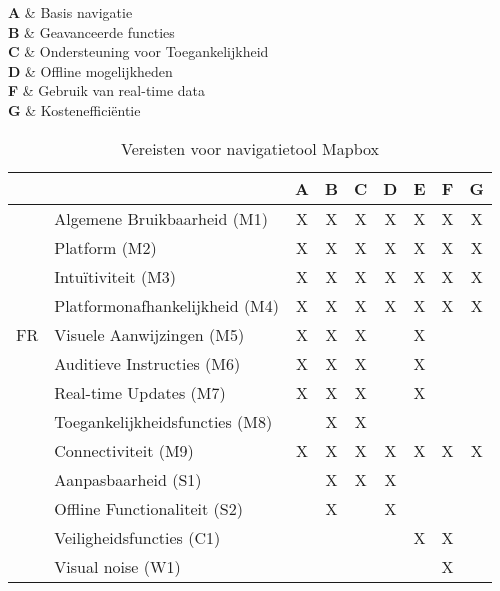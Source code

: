
\textbf{A} \& Basis navigatie \\
\textbf{B} \& Geavanceerde functies \\
\textbf{C} \& Ondersteuning voor Toegankelijkheid \\
\textbf{D} \& Offline mogelijkheden \\
\textbf{F} \& Gebruik van real-time data \\
\textbf{G} \& Kostenefficiëntie \\

\begin{table}[ht]
    \centering
    \caption{Vereisten voor navigatietool Mapbox}
    \label{tab:mapbox_requirements}
    \begin{tabular}{|l|l|c|c|c|c|c|c|c|}
        \hline
        & \textbf{} & \textbf{A} & \textbf{B} & \textbf{C} & \textbf{D} & \textbf{E} & \textbf{F} & \textbf{G} \\ \hline
        \multirow{9}{*}{FR} & Algemene Bruikbaarheid (M1) & X & X & X & X & X & X & X \\ \cline{2-9}
        & Platform (M2) & X & X & X & X & X & X & X \\ \cline{2-9}
        & Intuïtiviteit (M3) & X & X & X & X & X & X & X \\ \cline{2-9}
        & Platformonafhankelijkheid (M4) & X & X & X & X & X & X & X \\ \cline{2-9}
        & Visuele Aanwijzingen (M5) & X & X & X &  & X &  &  \\ \cline{2-9}
        & Auditieve Instructies (M6) & X & X & X &  & X &  &  \\ \cline{2-9}
        & Real-time Updates (M7) & X & X & X &  & X &  &  \\ \cline{2-9}
        & Toegankelijkheidsfuncties (M8) &  & X & X &  &  &  &  \\ \cline{2-9}
        & Connectiviteit (M9) & X & X & X & X & X & X & X \\ \cline{2-9}
        & Aanpasbaarheid (S1) &  & X & X & X &  &  &  \\ \cline{2-9}
        & Offline Functionaliteit (S2) &  & X &  & X &  &  &  \\ \cline{2-9}
        & Veiligheidsfuncties (C1) &  &  &  &  & X & X &  \\ \cline{2-9}
        & Visual noise (W1) &  &  &  &  &  & X &  \\ \cline{2-9}

\end{tabular}
\end{table}
